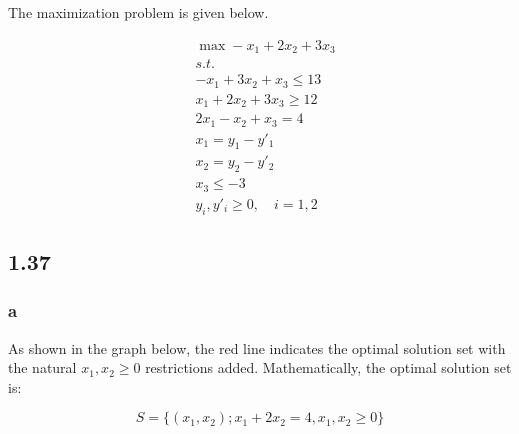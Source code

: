 \documentclass[11pt]{article}
\begin{document}
The maximization problem is given below.

\[
\begin{align*}
    & \max -x_1 + 2x_2 + 3x_3\\
    & s.t. \\
    & -x_1 + 3x_2 + x_3 \leq 13 \\
    & x_1 + 2x_2 + 3x_3 \geq 12 \\
    & 2x_1 - x_2 + x_3 = 4 \\
    & x_1 = y_1 - y'_1\\
    & x_2 = y_2 - y'_2 \\
    & x_3 \leq -3 \\
    & y_i, y'_i \geq 0, \quad i=1,2
 \end{align*}
\]

    \hypertarget{section}{%
\subsection{1.37}\label{section}}

\hypertarget{a}{%
\subsubsection{a}\label{a}}

As shown in the graph below, the red line indicates the optimal solution
set with the natural \(x_1, x_2 \geq 0\) restrictions added.
Mathematically, the optimal solution set is:

\[S=\{(x_1, x_2); x_1+2x_2=4, x_1, x_2 \geq 0\}\]
\end{document}
